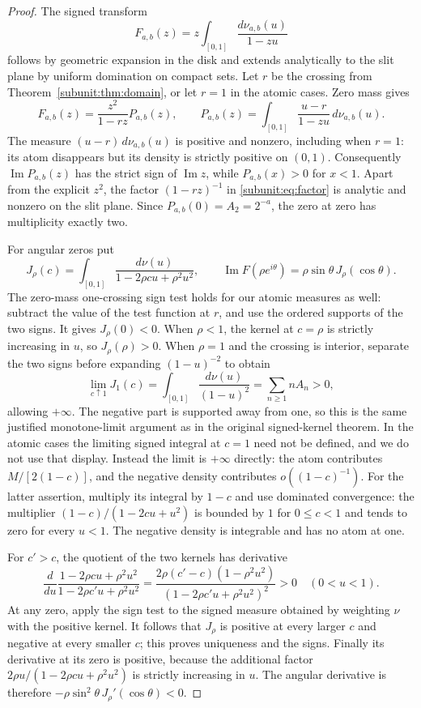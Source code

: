 \begin{proof}
The signed transform
\[
 F_{a,b}(z)=z\int_{[0,1]}\frac{d\nu_{a,b}(u)}{1-zu}
\]
follows by geometric expansion in the disk and extends analytically
to the slit plane by uniform domination on compact sets. Let $r$ be
the crossing from Theorem~\ref{subunit:thm:domain}, or let $r=1$ in
the atomic cases. Zero mass gives
\begin{equation}\label{subunit:eq:factor}
 F_{a,b}(z)=\frac{z^2}{1-rz}P_{a,b}(z),\qquad
 P_{a,b}(z)=\int_{[0,1]}\frac{u-r}{1-zu}\,d\nu_{a,b}(u).
\end{equation}
The measure $(u-r)\,d\nu_{a,b}(u)$ is positive and nonzero, including
when $r=1$: its atom disappears but its density is strictly positive
on $(0,1)$. Consequently $\operatorname{Im}P_{a,b}(z)$ has the
strict sign of $\operatorname{Im}z$, while $P_{a,b}(x)>0$ for
$x<1$. Apart from the explicit $z^2$, the factor $(1-rz)^{-1}$ in
\eqref{subunit:eq:factor} is analytic and nonzero on the slit plane. Since $P_{a,b}(0)=A_2=2^{-a}$,
the zero at zero has multiplicity exactly two.

For angular zeros put
\[
 J_\rho(c)=\int_{[0,1]}\frac{d\nu(u)}{1-2\rho cu+\rho^2u^2},
 \qquad
 \operatorname{Im}F(\rho e^{i\theta})
       =\rho\sin\theta\,J_\rho(\cos\theta).
\]
The zero-mass one-crossing sign test holds for our atomic measures as
well: subtract the value of the test function at $r$, and use the
ordered supports of the two signs. It gives $J_\rho(0)<0$.
When $\rho<1$, the kernel at $c=\rho$ is strictly increasing in $u$,
so $J_\rho(\rho)>0$. When $\rho=1$ and the crossing is interior,
separate the two signs before expanding $(1-u)^{-2}$ to obtain
\[
 \lim_{c\uparrow1}J_1(c)
 =\int_{[0,1]}\frac{d\nu(u)}{(1-u)^2}
 =\sum_{n\geq1}n A_n>0,
\]
allowing $+\infty$. The negative part is supported away from one, so
this is the same justified monotone-limit argument as in the original
signed-kernel theorem. In the atomic cases the limiting signed
integral at $c=1$ need not be defined, and we do not use that display.
Instead the limit is $+\infty$ directly: the atom contributes
$M/[2(1-c)]$, and the negative density contributes
$o((1-c)^{-1})$. For the latter assertion, multiply its integral by
$1-c$ and use dominated convergence: the multiplier
$(1-c)/(1-2cu+u^2)$ is bounded by $1$ for $0\leq c<1$ and tends to zero for
every $u<1$. The negative density is integrable and has no atom at one.

For $c'>c$, the quotient of the two kernels has derivative
\[
 \frac{d}{du}\frac{1-2\rho cu+\rho^2u^2}
                         {1-2\rho c'u+\rho^2u^2}
 =\frac{2\rho(c'-c)(1-\rho^2u^2)}
       {(1-2\rho c'u+\rho^2u^2)^2}>0\quad(0<u<1).
\]
At any zero, apply the sign test to the signed measure obtained by
weighting $\nu$ with the positive kernel. It follows that $J_\rho$
is positive at every larger $c$ and negative at every smaller $c$;
this proves uniqueness and the signs. Finally its derivative at its
zero is positive, because the additional factor
$2\rho u/(1-2\rho cu+\rho^2u^2)$ is strictly increasing in $u$.
The angular derivative is therefore
$-\rho\sin^2\theta\,J_\rho'(\cos\theta)<0$.
\end{proof}

